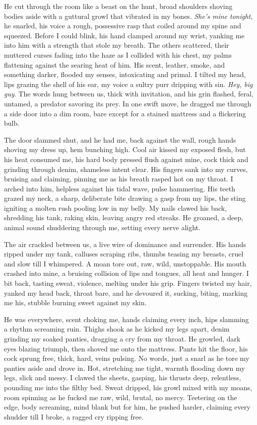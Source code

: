 \documentclass[12pt,oneside]{book}
\begin{document}
He cut through the room like a beast on the hunt, broad shoulders shoving bodies aside with a guttural growl that vibrated in my bones. \textit{She’s mine tonight}, he snarled, his voice a rough, possessive rasp that coiled around my spine and squeezed. Before I could blink, his hand clamped around my wrist, yanking me into him with a strength that stole my breath. The others scattered, their muttered curses fading into the haze as I collided with his chest, my palms flattening against the searing heat of him. His scent, leather, smoke, and something darker, flooded my senses, intoxicating and primal. I tilted my head, lips grazing the shell of his ear, my voice a sultry purr dripping with sin. \textit{Hey, big guy}. The words hung between us, thick with invitation, and his grin flashed, feral, untamed, a predator savoring its prey. In one swift move, he dragged me through a side door into a dim room, bare except for a stained mattress and a flickering bulb.

The door slammed shut, and he had me, back against the wall, rough hands shoving my dress up, hem bunching high. Cool air kissed my exposed flesh, but his heat consumed me, his hard body pressed flush against mine, cock thick and grinding through denim, shameless intent clear. His fingers sank into my curves, bruising and claiming, pinning me as his breath rasped hot on my throat. I arched into him, helpless against his tidal wave, pulse hammering. His teeth grazed my neck, a sharp, deliberate bite drawing a gasp from my lips, the sting igniting a molten rush pooling low in my belly. My nails clawed his back, shredding his tank, raking skin, leaving angry red streaks. He groaned, a deep, animal sound shuddering through me, setting every nerve alight.

The air crackled between us, a live wire of dominance and surrender. His hands ripped under my tank, calluses scraping ribs, thumbs teasing my breasts, cruel and slow till I whimpered. A moan tore out, raw, wild, unstoppable. His mouth crashed into mine, a bruising collision of lips and tongues, all heat and hunger. I bit back, tasting sweat, violence, melting under his grip. Fingers twisted my hair, yanked my head back, throat bare, and he devoured it, sucking, biting, marking me his, stubble burning sweet against my skin.

He was everywhere, scent choking me, hands claiming every inch, hips slamming a rhythm screaming ruin. Thighs shook as he kicked my legs apart, denim grinding my soaked panties, dragging a cry from my throat. He growled, dark eyes blazing triumph, then shoved me onto the mattress. Pants hit the floor, his cock sprung free, thick, hard, veins pulsing. No words, just a snarl as he tore my panties aside and drove in. Hot, stretching me tight, warmth flooding down my legs, slick and messy. I clawed the sheets, gasping, his thrusts deep, relentless, pounding me into the filthy bed. Sweat dripped, his growl mixed with my moans, room spinning as he fucked me raw, wild, brutal, no mercy. Teetering on the edge, body screaming, mind blank but for him, he pushed harder, claiming every shudder till I broke, a ragged cry ripping free.
\end{document}
